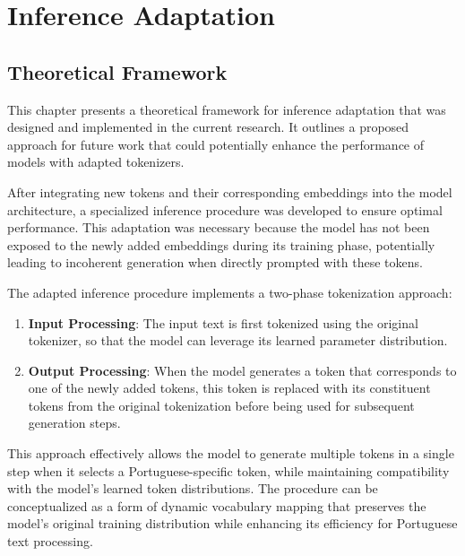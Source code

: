 
\chapter{Inference Adaptation}


\label{chap:inference_adaptation}

\section{Theoretical Framework}
This chapter presents a theoretical framework for inference adaptation that was designed and implemented in the current research. It outlines a proposed approach for future work that could potentially enhance the performance of models with adapted tokenizers.

After integrating new tokens and their corresponding embeddings into the model architecture, a specialized inference procedure was developed to ensure optimal performance. This adaptation was necessary because the model has not been exposed to the newly added embeddings during its training phase, potentially leading to incoherent generation when directly prompted with these tokens.

The adapted inference procedure implements a two-phase tokenization approach:

\begin{enumerate}
    \item \textbf{Input Processing}: The input text is first tokenized using the original tokenizer, so that the model can leverage its learned parameter distribution.
    
    \item \textbf{Output Processing}: When the model generates a token that corresponds to one of the newly added tokens, this token is replaced with its constituent tokens from the original tokenization before being used for subsequent generation steps.
\end{enumerate}

This approach effectively allows the model to generate multiple tokens in a single step when it selects a Portuguese-specific token, while maintaining compatibility with the model's learned token distributions. The procedure can be conceptualized as a form of dynamic vocabulary mapping that preserves the model's original training distribution while enhancing its efficiency for Portuguese text processing.


